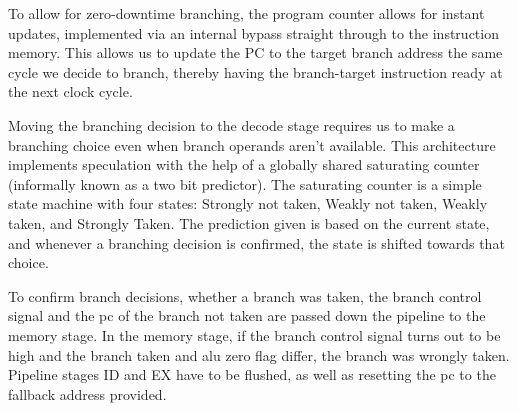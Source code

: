 To allow for zero-downtime branching, the program counter allows for instant updates, implemented via an internal bypass straight through to the instruction memory.
This allows us to update the PC to the target branch address the same cycle we decide to branch, thereby having the branch-target instruction ready at the next clock cycle.

Moving the branching decision to the decode stage requires us to make a branching choice even when branch operands aren't available.
This architecture implements speculation with the help of a globally shared saturating counter (informally known as a two bit predictor).
The saturating counter is a simple state machine with four states: Strongly not taken, Weakly not taken, Weakly taken, and Strongly Taken.
The prediction given is based on the current state, and whenever a branching decision is confirmed, the state is shifted towards that choice.

To confirm branch decisions, whether a branch was taken, the branch control signal and the pc of the branch not taken are passed down the pipeline to the memory stage.
In the memory stage, if the branch control signal turns out to be high and the branch taken and alu zero flag differ, the branch was wrongly taken.
Pipeline stages ID and EX have to be flushed, as well as resetting the pc to the fallback address provided.
